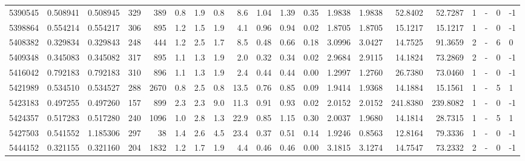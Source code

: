 \begin{tabular}{rrrrrrrrrrrrrrrrrlrl}
   5390545 & 0.508941 &   0.508945 &  329 &  389 &      0.8 &      1.9 &     0.8 &      8.6 &       1.04 &        1.39 &        0.35 &  1.9838 &  1.9838 &   52.8402 &   52.7287 &       1 &             - &        0 &        -1 \\
   5398864 & 0.554214 &   0.554217 &  306 &  895 &      1.2 &      1.5 &     1.9 &      4.1 &       0.96 &        0.94 &        0.02 &  1.8705 &  1.8705 &   15.1217 &   15.1217 &       1 &             - &        0 &        -1 \\
   5408382 & 0.329834 &   0.329843 &  248 &  444 &      1.2 &      2.5 &     1.7 &      8.5 &       0.48 &        0.66 &        0.18 &  3.0996 &  3.0427 &   14.7525 &   91.3659 &       2 &             - &        6 &         0 \\
   5409348 & 0.345083 &   0.345082 &  317 &  895 &      1.1 &      1.3 &     1.9 &      2.0 &       0.32 &        0.34 &        0.02 &  2.9684 &  2.9115 &   14.1824 &   73.2869 &       2 &             - &        0 &        -1 \\
   5416042 & 0.792183 &   0.792183 &  310 &  896 &      1.1 &      1.3 &     1.9 &      2.4 &       0.44 &        0.44 &        0.00 &  1.2997 &  1.2760 &   26.7380 &   73.0460 &       1 &             - &        0 &        -1 \\
   5421989 & 0.534510 &   0.534527 &  288 & 2670 &      0.8 &      2.5 &     0.8 &     13.5 &       0.76 &        0.85 &        0.09 &  1.9414 &  1.9368 &   14.1884 &   15.1561 &       1 &             - &        5 &         1 \\
   5423183 & 0.497255 &   0.497260 &  157 &  899 &      2.3 &      2.3 &     9.0 &     11.3 &       0.91 &        0.93 &        0.02 &  2.0152 &  2.0152 &  241.8380 &  239.8082 &       1 &             - &        0 &        -1 \\
   5424357 & 0.517283 &   0.517280 &  240 & 1096 &      1.0 &      2.8 &     1.3 &     22.9 &       0.85 &        1.15 &        0.30 &  2.0037 &  1.9680 &   14.1814 &   28.7315 &       1 &             - &        5 &         1 \\
   5427503 & 0.541552 &   1.185306 &  297 &   38 &      1.4 &      2.6 &     4.5 &     23.4 &       0.37 &        0.51 &        0.14 &  1.9246 &  0.8563 &   12.8164 &   79.3336 &       1 &             - &        0 &        -1 \\
   5444152 & 0.321155 &   0.321160 &  204 & 1832 &      1.2 &      1.7 &     1.9 &      4.4 &       0.46 &        0.46 &        0.00 &  3.1815 &  3.1274 &   14.7547 &   73.2332 &       2 &             - &        0 &        -1 \\

\end{tabular}

